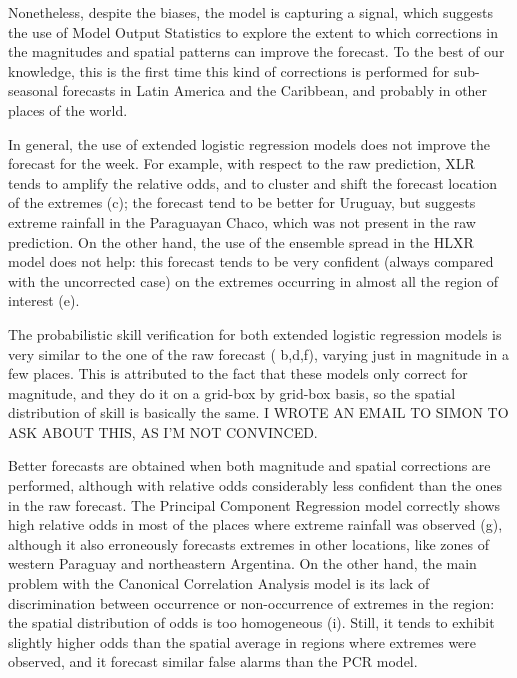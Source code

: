 \documentclass{ametsoc}
\begin{document}
Nonetheless, despite the biases, the model is capturing a signal, which suggests the use of Model Output Statistics to explore the extent to which corrections in the magnitudes and spatial patterns can improve the forecast. To the best of our knowledge, this is the first time this kind of corrections is performed for sub-seasonal forecasts in Latin America and the Caribbean, and probably in other places of the world.

In general, the use of extended logistic regression models does not improve the forecast for the week. For example, with respect to the raw prediction, XLR tends to amplify the relative odds, and to cluster and shift the forecast location of the extremes (c); the forecast tend to be better for Uruguay, but suggests extreme rainfall in the Paraguayan Chaco, which was not present in the raw prediction. On the other hand, the use of the ensemble spread in the HLXR model does not help: this forecast tends to be very confident (always compared with the uncorrected case) on the extremes occurring in almost all the region of interest (e).

The probabilistic skill verification for both extended logistic regression models is very similar to the one of the raw forecast ( b,d,f), varying just in magnitude in a few places. This is attributed to the fact that these models only correct for magnitude, and they do it on a grid-box by grid-box basis, so the spatial distribution of skill is basically the same. I WROTE AN EMAIL TO SIMON TO ASK ABOUT THIS, AS I'M NOT CONVINCED.

Better forecasts are obtained when both magnitude and spatial corrections are performed, although with relative odds considerably less confident than the ones in the raw forecast. The Principal Component Regression model correctly shows high relative odds in most of the places where extreme rainfall was observed (g), although it also erroneously forecasts extremes in other locations, like zones of western Paraguay and northeastern Argentina. On the other hand, the main problem with the Canonical Correlation Analysis model is its lack of discrimination between occurrence or non-occurrence of extremes in the region: the spatial distribution of odds is too homogeneous (i). Still, it tends to exhibit slightly higher odds than the spatial average in regions where extremes were observed, and it forecast similar false alarms than the PCR model.
\end{document}
